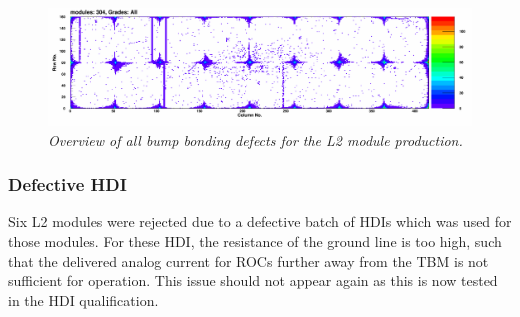 \documentclass[a4paper,12pt,twoside]{article}
\begin{document}
\begin{figure} [h!] \centering 
\includegraphics[width=\textwidth, angle=0] {./Figures/Xray_BB_All.png}
\caption{\em  \label{BB}
Overview of all bump bonding defects for the L2 module production.}
\end{figure}

\subsubsection{Defective HDI}
Six L2 modules were rejected due to a defective batch of HDIs which was used for those modules. For these HDI, the resistance of the ground line is too high, such that the delivered analog current for ROCs further away from the TBM is not sufficient for operation. This issue should not appear again as this is now tested in the HDI qualification.

\clearpage
\end{document}
